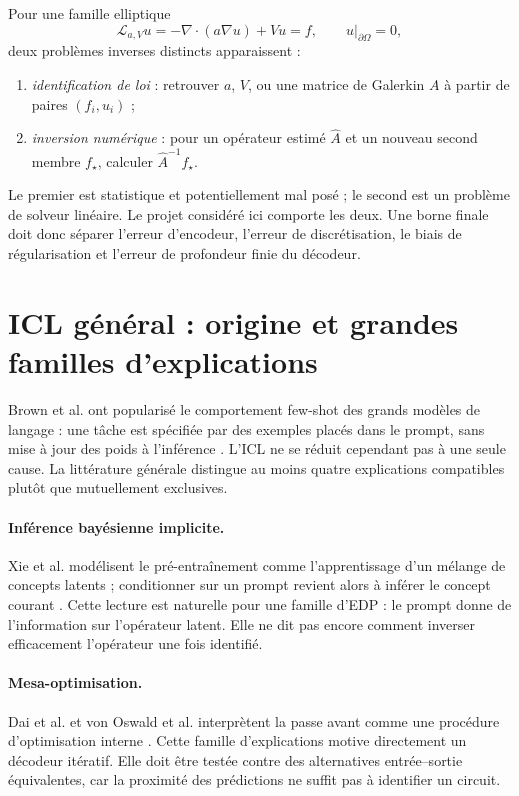 \documentclass[11pt,a4paper]{article}
\newcommand{\cL}{\mathcal{L}}
\begin{document}
Pour une famille elliptique
\begin{equation}
  \cL_{a,V}u=-\nabla\!\cdot(a\nabla u)+Vu=f,
  \qquad u|_{\partial\Omega}=0,
  \label{eq:pde}
\end{equation}
deux problèmes inverses distincts apparaissent :
\begin{enumerate}[leftmargin=*]
  \item \emph{identification de loi} : retrouver $a$, $V$, ou une matrice de
  Galerkin $A$ à partir de paires $(f_i,u_i)$ ;
  \item \emph{inversion numérique} : pour un opérateur estimé $\widehat A$ et
  un nouveau second membre $f_\star$, calculer $\widehat A^{-1}f_\star$.
\end{enumerate}
Le premier est statistique et potentiellement mal posé ; le second est un
problème de solveur linéaire. Le projet considéré ici comporte les deux. Une
borne finale doit donc séparer l'erreur d'encodeur, l'erreur de discrétisation,
le biais de régularisation et l'erreur de profondeur finie du décodeur.

\section{ICL général : origine et grandes familles d'explications}

Brown et al. ont popularisé le comportement few-shot des grands modèles de
langage : une tâche est spécifiée par des exemples placés dans le prompt, sans
mise à jour des poids à l'inférence \cite{brown2020}. L'ICL ne se réduit
cependant pas à une seule cause. La littérature générale distingue au moins
quatre explications compatibles plutôt que mutuellement exclusives.

\paragraph{Inférence bayésienne implicite.}
Xie et al. modélisent le pré-entraînement comme l'apprentissage d'un mélange de
concepts latents ; conditionner sur un prompt revient alors à inférer le concept
courant \cite{xie2022bayesian}. Cette lecture est naturelle pour une famille
d'EDP : le prompt donne de l'information sur l'opérateur latent. Elle ne dit
pas encore comment inverser efficacement l'opérateur une fois identifié.

\paragraph{Mesa-optimisation.}
Dai et al. et von Oswald et al. interprètent la passe avant comme une procédure
d'optimisation interne \cite{dai2023meta,vonoswald2023}. Cette famille
d'explications motive directement un décodeur itératif. Elle doit être testée
contre des alternatives entrée--sortie équivalentes, car la proximité des
prédictions ne suffit pas à identifier un circuit.
\end{document}
